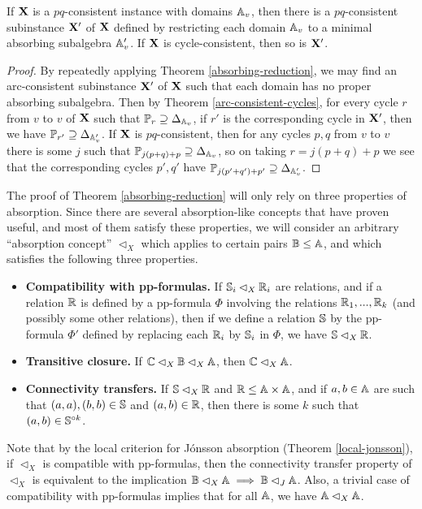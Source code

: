 \documentclass[letterpaper,11pt]{article}
\begin{document}
\begin{thm}\label{absorbing-pq} If $\mathbf{X}$ is a $pq$-consistent instance with domains $\mathbb{A}_v$, then there is a $pq$-consistent subinstance $\mathbf{X}'$ of $\mathbf{X}$ defined by restricting each domain $\mathbb{A}_v$ to a minimal absorbing subalgebra $\mathbb{A}_v'$. If $\mathbf{X}$ is cycle-consistent, then so is $\mathbf{X}'$.
\end{thm}
\begin{proof} By repeatedly applying Theorem \ref{absorbing-reduction}, we may find an arc-consistent subinstance $\mathbf{X}'$ of $\mathbf{X}$ such that each domain has no proper absorbing subalgebra. Then by Theorem \ref{arc-consistent-cycles}, for every cycle $r$ from $v$ to $v$ of $\mathbf{X}$ such that $\mathbb{P}_r \supseteq \Delta_{\mathbb{A}_v}$, if $r'$ is the corresponding cycle in $\mathbf{X}'$, then we have $\mathbb{P}_{r'} \supseteq \Delta_{\mathbb{A}_v'}$. If $\mathbf{X}$ is $pq$-consistent, then for any cycles $p,q$ from $v$ to $v$ there is some $j$ such that $\mathbb{P}_{j(p+q)+p} \supseteq \Delta_{\mathbb{A}_v}$, so on taking $r = j(p+q)+p$ we see that the corresponding cycles $p',q'$ have $\mathbb{P}_{j(p'+q')+p'} \supseteq \Delta_{\mathbb{A}_v'}$.
\end{proof}

The proof of Theorem \ref{absorbing-reduction} will only rely on three properties of absorption. Since there are several absorption-like concepts that have proven useful, and most of them satisfy these properties, we will consider an arbitrary ``absorption concept'' $\lhd_X$ which applies to certain pairs $\mathbb{B} \le \mathbb{A}$, and which satisfies the following three properties.
\begin{itemize}
\item {\bf Compatibility with pp-formulas.} If $\mathbb{S}_i \lhd_X \mathbb{R}_i$ are relations, and if a relation $\mathbb{R}$ is defined by a pp-formula $\Phi$ involving the relations $\mathbb{R}_1, ..., \mathbb{R}_k$ (and possibly some other relations), then if we define a relation $\mathbb{S}$ by the pp-formula $\Phi'$ defined by replacing each $\mathbb{R}_i$ by $\mathbb{S}_i$ in $\Phi$, we have $\mathbb{S} \lhd_X \mathbb{R}$.

\item {\bf Transitive closure.} If $\mathbb{C} \lhd_X \mathbb{B} \lhd_X \mathbb{A}$, then $\mathbb{C} \lhd_X \mathbb{A}$.

\item {\bf Connectivity transfers.} If $\mathbb{S} \lhd_X \mathbb{R}$ and $\mathbb{R} \le \mathbb{A} \times \mathbb{A}$, and if $a,b \in \mathbb{A}$ are such that $(a,a), (b,b) \in \mathbb{S}$ and $(a,b) \in \mathbb{R}$, then there is some $k$ such that $(a,b) \in \mathbb{S}^{\circ k}$.
\end{itemize}
Note that by the local criterion for J\'onsson absorption (Theorem \ref{local-jonsson}), if $\lhd_X$ is compatible with pp-formulas, then the connectivity transfer property of $\lhd_X$ is equivalent to the implication $\mathbb{B} \lhd_X \mathbb{A} \implies \mathbb{B} \lhd_J \mathbb{A}$. Also, a trivial case of compatibility with pp-formulas implies that for all $\mathbb{A}$, we have $\mathbb{A} \lhd_X \mathbb{A}$.
\end{document}
